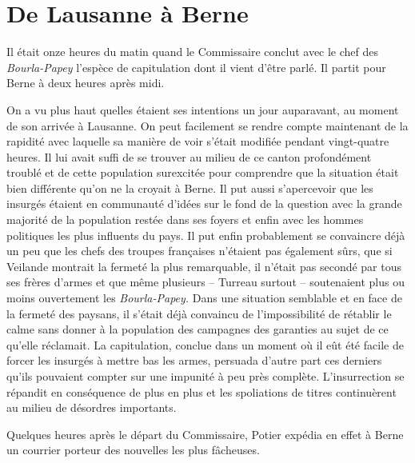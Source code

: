 \documentclass[french,twoside]{book} %
\begin{document}
\section[De Lausanne à Berne]{De Lausanne à Berne}
\noindent Il était onze heures du matin quand le Commissaire conclut avec le chef des \emph{Bourla-Papey} l’espèce de capitulation dont il vient d’être parlé. Il partit pour Berne à deux heures après midi.\par
On a vu plus haut quelles étaient ses intentions un jour auparavant, au moment de son arrivée à Lausanne. On peut facilement se rendre compte maintenant de la rapidité avec laquelle sa manière de voir s’était modifiée pendant vingt-quatre heures. Il lui avait suffi de se trouver au milieu de ce canton profondément troublé et de cette population surexcitée pour comprendre que la situation était bien différente qu’on ne la croyait à Berne. Il put aussi s’apercevoir que les insurgés étaient en communauté d’idées sur le fond de la question avec la grande majorité de la population restée dans ses foyers et enfin avec les hommes politiques les plus influents du pays. Il put enfin probablement se convaincre déjà un peu que les chefs des troupes françaises n’étaient pas également sûrs, que si Veilande montrait la fermeté la plus remarquable, il n’était pas secondé par tous ses frères d’armes et que même plusieurs – Turreau surtout – soutenaient plus ou moins ouvertement les \emph{Bourla-Papey.} Dans une situation semblable et en face de la fermeté des paysans, il s’était déjà convaincu de l’impossibilité de rétablir le calme sans donner à la population des campagnes des garanties au sujet de ce qu’elle réclamait. La capitulation, conclue dans un moment où il eût été facile de forcer les insurgés à mettre bas les armes, persuada d’autre part ces derniers qu’ils pouvaient compter sur une impunité à peu près complète. L’insurrection se répandit en conséquence de plus en plus et les spoliations de titres continuèrent au milieu de désordres importants.\par
Quelques heures après le départ du Commissaire, Potier expédia en effet à Berne un courrier porteur des nouvelles les plus fâcheuses.\par
\end{document}
